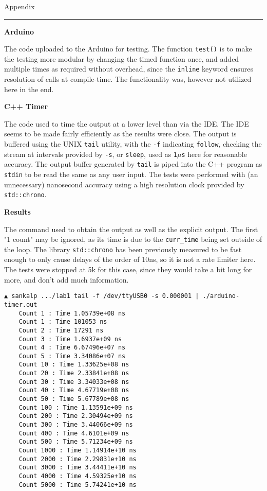 \newpage
{\large Appendix}
\hrule
\label{appendix}

\textbf{Arduino}
\label{appendix:arduino}

The code uploaded to the Arduino for testing. The function
\texttt{test()} is to make the testing more modular by changing the timed
function once, and added multiple times as required without overhead,
since the \texttt{inline} keyword ensures resolution of calls at compile-time.
The functionality was, however not utilized here in the end.



\textbf{C++ Timer}
\label{appendix:cpp}

The code used to time the output at a lower level than via the IDE.
The IDE seems to be made fairly efficiently as the results were close.
The output is buffered using the UNIX \texttt{tail} utility, with the \texttt{-f}
indicating \texttt{follow}, checking the stream at intervals provided by \texttt{-s},
or \texttt{sleep}, used as \texttt{1$\mu$s} here for reasonable accuracy. The output 
buffer generated by \texttt{tail} is piped into the C++ program as \texttt{stdin} to
be read the same as any user input. The tests were performed with (an unnecessary)
nanosecond accuracy using a high resolution clock provided by \texttt{std::chrono}.




\textbf{Results}
\label{appendix:results}

The command used to obtain the output as well as the explicit output.
The first "1 count" may be ignored, as its time is due to the \texttt{curr\_time}
being set outside of the loop. The library \texttt{std::chrono} has been previously
measured to be fast enough to only cause delays of the order of 10ns, so it is 
not a rate limiter here. The tests were stopped at 5k for this case, since they would
take a bit long for more, and don't add much information.

\begin{verbatim}
▲ sankalp .../lab1 tail -f /dev/ttyUSB0 -s 0.000001 | ./arduino-timer.out
    Count 1 : Time 1.05739e+08 ns
    Count 1 : Time 101053 ns
    Count 2 : Time 17291 ns
    Count 3 : Time 1.6937e+09 ns
    Count 4 : Time 6.67496e+07 ns
    Count 5 : Time 3.34086e+07 ns
    Count 10 : Time 1.33625e+08 ns
    Count 20 : Time 2.33841e+08 ns
    Count 30 : Time 3.34033e+08 ns
    Count 40 : Time 4.67719e+08 ns
    Count 50 : Time 5.67789e+08 ns
    Count 100 : Time 1.13591e+09 ns
    Count 200 : Time 2.30494e+09 ns
    Count 300 : Time 3.44066e+09 ns
    Count 400 : Time 4.6101e+09 ns
    Count 500 : Time 5.71234e+09 ns
    Count 1000 : Time 1.14914e+10 ns
    Count 2000 : Time 2.29831e+10 ns
    Count 3000 : Time 3.44411e+10 ns
    Count 4000 : Time 4.59325e+10 ns
    Count 5000 : Time 5.74241e+10 ns
\end{verbatim}

